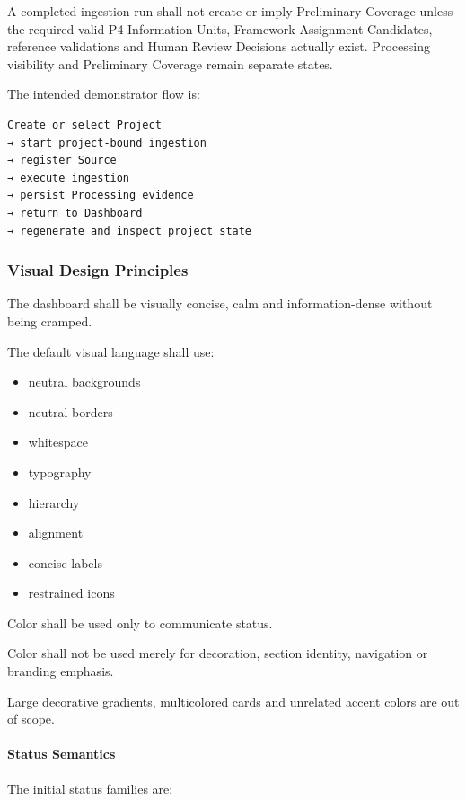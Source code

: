 A completed ingestion run shall not create or imply Preliminary Coverage unless the required valid P4 Information Units, Framework Assignment Candidates, reference validations and Human Review Decisions actually exist. Processing visibility and Preliminary Coverage remain separate states.

The intended demonstrator flow is:

\begin{verbatim}
Create or select Project
→ start project-bound ingestion
→ register Source
→ execute ingestion
→ persist Processing evidence
→ return to Dashboard
→ regenerate and inspect project state
\end{verbatim}

\hypertarget{visual-design-principles}{%
\subsubsection{Visual Design Principles}\label{visual-design-principles}}

The dashboard shall be visually concise, calm and information-dense without being cramped.

The default visual language shall use:

\begin{itemize}
\tightlist
\item
  neutral backgrounds
\item
  neutral borders
\item
  whitespace
\item
  typography
\item
  hierarchy
\item
  alignment
\item
  concise labels
\item
  restrained icons
\end{itemize}

Color shall be used only to communicate status.

Color shall not be used merely for decoration, section identity, navigation or branding emphasis.

Large decorative gradients, multicolored cards and unrelated accent colors are out of scope.

\hypertarget{status-semantics}{%
\paragraph{Status Semantics}\label{status-semantics}}

The initial status families are:

